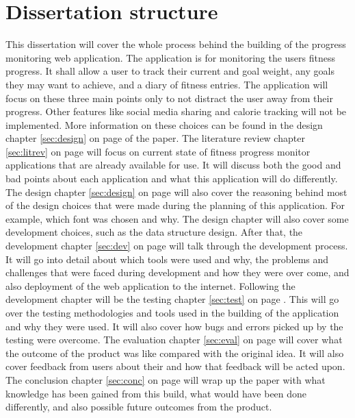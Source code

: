 \section{Dissertation structure}
This dissertation will cover the whole process behind the building of the progress monitoring web application. The application is for monitoring the users fitness progress. It shall allow a user to track their current and goal weight, any goals they may want to achieve, and a diary of fitness entries. The application will focus on these three main points only to not distract the user away from their progress. Other features like social media sharing and calorie tracking will not be implemented. More information on these choices can be found in the design chapter \ref{sec:design} on page \pageref{sec:design} of the paper. The literature review chapter \ref{sec:litrev} on page \pageref{sec:litrev} will focus on current state of fitness progress monitor applications that are already available for use. It will discuss both the good and bad points about each application and what this application will do differently. The design chapter \ref{sec:design} on page \pageref{sec:design} will also cover the reasoning behind most of the design choices that were made during the planning of this application. For example, which font was chosen and why. The design chapter will also cover some development choices, such as the data structure design. After that, the development chapter \ref{sec:dev} on page \pageref{sec:dev} will talk through the development process. It will go into detail about which tools were used and why, the problems and challenges that were faced during development and how they were over come, and also deployment of the web application to the internet. Following the development chapter will be the testing chapter \ref{sec:test} on page \pageref{sec:test}. This will go over the testing methodologies and tools used in the building of the application and why they were used. It will also cover how bugs and errors picked up by the testing were overcome. The evaluation chapter \ref{sec:eval} on page \pageref{sec:eval} will cover what the outcome of the product was like compared with the original idea. It will also cover feedback from users about their and how that feedback will be acted upon. The conclusion chapter \ref{sec:conc} on page \pageref{sec:conc} will wrap up the paper with what knowledge has been gained from this build, what would have been done differently, and also possible future outcomes from the product.\\

